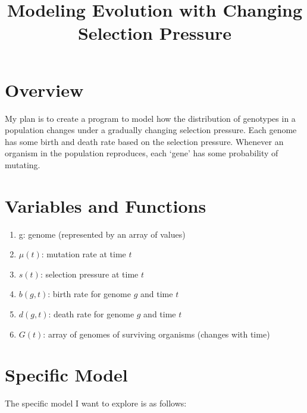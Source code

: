 \documentclass[11pt]{article}
\title{Modeling Evolution with Changing Selection Pressure}
\author{\Name}
\date{}
\begin{document}
\maketitle


\section*{Overview}

	My plan is to create a program to model how the distribution of genotypes in a population changes under a gradually changing selection pressure. Each genome has some birth and death rate based on the selection pressure. Whenever an organism in the population reproduces, each `gene' has some probability of mutating.


\section*{Variables and Functions}

	\begin{enumerate}
		
		\item
		g: genome (represented by an array of values)
		
		\item
		$\mu(t)$: mutation rate at time $t$
		
		\item
		$s(t)$: selection pressure at time $t$
		
		\item
		$b(g,t)$: birth rate for genome $g$ and time $t$
		
		\item
		$d(g,t)$: death rate for genome $g$ and time $t$
		
		\item
		$G(t)$: array of genomes of surviving organisms (changes with time)
		
		
	\end{enumerate}
	
\section*{Specific Model}

	The specific model I want to explore is as follows:
	
\end{document}
